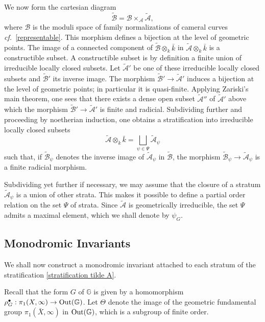 \documentclass[12pt,english]{smfart}
\numberwithin{equation}{subsection}
\theoremstyle{remark}
\newcommand\Out{{\rm Out}}
\newcommand\cf{{\it cf.\ }}
\begin{document}
We now form the cartesian diagram
$$\tilde{\mathcal{B}}=\mathcal{B}\times_{\mathcal{A}}\tilde{\mathcal{A}},$$
where $\mathcal{B}$ is the moduli space of family normalizations of cameral curves \cf \ref{representable}. This morphism defines a bijection at the level of geometric points. The image of a connected component of $\tilde{\mathcal{B}}\otimes_k\bar k$ in $\tilde{\mathcal{A}}\otimes_k\bar k$ is a constructible subset. A constructible subset is by definition a finite union of irreducible locally closed subsets. Let $\tilde{\mathcal{A}}'$ be one of these irreducible locally closed subsets and $\tilde{\mathcal{B}}'$ its inverse image. The morphism $\tilde{\mathcal{B}}'\rightarrow\tilde{\mathcal{A}}'$ induces a bijection at the level of geometric points; in particular it is quasi-finite. Applying Zariski's main theorem, one sees that there exists a dense open subset $\tilde{\mathcal{A}}''$ of $\tilde{\mathcal{A}}'$ above which the morphism $\tilde{\mathcal{B}}'\rightarrow\tilde{\mathcal{A}}'$ is finite and radicial. Subdividing further and proceeding by noetherian induction, one obtains a stratification into irreducible locally closed subsets
\begin{equation}\label{stratification tilde A}
\tilde{\mathcal{A}}\otimes_k\bar k=\bigsqcup_{\psi\in\Psi}\tilde{\mathcal{A}}_\psi
\end{equation}
such that, if $\tilde{\mathcal{B}}_\psi$ denotes the inverse image of $\tilde{\mathcal{A}}_\psi$ in $\tilde{\mathcal{B}}$, the morphism $\tilde{\mathcal{B}}_\psi\rightarrow\tilde{\mathcal{A}}_\psi$ is a finite radicial morphism.

Subdividing yet further if necessary, we may assume that the closure of a stratum $\tilde{\mathcal{A}}_\psi$ is a union of other strata. This makes it possible to define a partial order relation on the set $\Psi$ of strata. Since $\tilde{\mathcal{A}}$ is geometrically irreducible, the set $\Psi$ admits a maximal element, which we shall denote by $\psi_G$.

\subsection{Monodromic Invariants}\label{subsection : stratification monodromique}

We shall now construct a monodromic invariant attached to each stratum of the stratification \ref{stratification tilde A}.

Recall that the form $G$ of $\mathbb{G}$ is given by a homomorphism $\rho_G^\bullet:\pi_1(X,\infty)\rightarrow\Out(\mathbb{G})$. Let $\Theta$ denote the image of the geometric fundamental group $\pi_1(\bar X,\infty)$ in $\Out(\mathbb{G})$, which is a subgroup of finite order.
\end{document}
